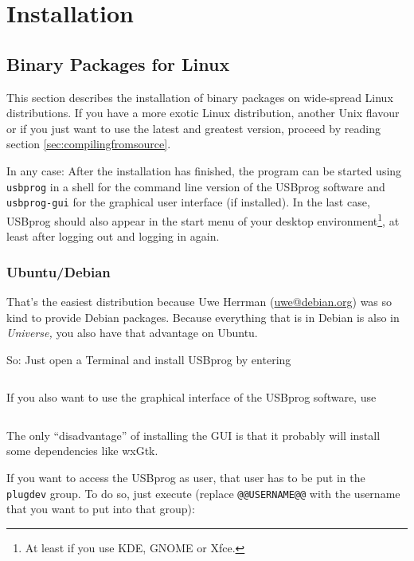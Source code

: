 \documentclass[bibtotoc,UKenglish,halfparskip,oneside,DIV12]{scrreprt}
\begin{document}
\section{Installation}
\label{sec:installation}

\subsection{Binary Packages for Linux}
\label{sec:linux_binary_installation}

This section describes the installation of binary packages on wide-spread Linux distributions. If
you have a more exotic Linux distribution, another Unix flavour or if you just want to use the
latest and greatest version, proceed by reading section \vref{sec:compilingfromsource}.

In any case: After the installation has finished, the program can be started using \texttt{usbprog}
in a shell for the command line version of the USBprog software and \texttt{usbprog-gui} for the
graphical user interface (if installed). In the last case, USBprog should also appear in the start
menu of your desktop environment\footnote{At least if you use KDE, GNOME or Xfce.}, at least after
logging out and logging in again.

\subsubsection{Ubuntu/Debian}

That's the easiest distribution because Uwe Herrman (\url{uwe@debian.org}) was so kind to provide
Debian packages. Because everything that is in Debian is also in \emph{Universe,} you also have that
advantage on Ubuntu.

So: Just open a Terminal and install USBprog by entering

\begin{lstlisting}[style=inline]
% sudo aptitude install usbprog
\end{lstlisting}

If you also want to use the graphical interface of the USBprog software, use

\begin{lstlisting}[style=inline]
% sudo aptitude install usbprog usbprog-gui
\end{lstlisting}

The only ``disadvantage'' of installing the GUI is that it probably will install some dependencies
like wxGtk.

If you want to access the USBprog as user, that user has to be put in the \texttt{plugdev} group. To
do so, just execute (replace \texttt{@@USERNAME@@} with the username that you want to put into that
group):
\end{document}
